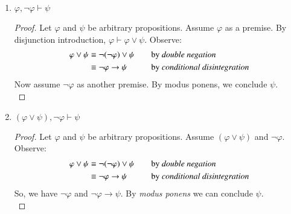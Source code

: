 \documentclass{article}
\newcommand{\lif}{\mathrel{\rightarrow}}
\newcommand{\proves}{\mathrel{\vdash}}
\begin{document}
\begin{enumerate}
\begin{enumerate}
\begin{proof}
\begin{align*}
              \\
            &\equiv \neg(\varphi\lor\psi)\lor\xi
              &\quad
              &\text{by \emph{De Morgan's laws}}
              \\
            &\equiv (\varphi\lor\psi)\lif\xi
              &\quad
              &\text{by \emph{conditional disintegration}}
              \\
        \end{align*}
        So, we have $\varphi\lor\psi$ and$(\varphi\lor\psi)\lif\xi$. By \emph{modus ponens} we can conclude $\xi$.\\
        \end{proof}
\pagebreak
        \item $\varphi, \neg \varphi \proves \psi$
        \begin{proof}
        Let $\varphi$ and $\psi$ be arbitrary propositions. Assume $\varphi$ as a premise. By disjunction introduction, $\varphi\proves\varphi\lor\psi$. Observe:
        \begin{align*}
          \varphi\lor\psi
            &\equiv \neg(\neg\varphi)\lor\psi
              &\quad
              &\text{by \emph{double negation}}
              \\
            &\equiv \neg\varphi\lif\psi
              &\quad
              &\text{by \emph{conditional disintegration}}
              \\
        \end{align*}
        Now assume $\neg\varphi$ as another premise. By modus ponens, we conclude $\psi$.\\
        \end{proof}
        \item $(\varphi \lor \psi), \neg \varphi \proves \psi$
        \begin{proof}
        Let $\varphi$ and $\psi$ be arbitrary propositions. Assume $(\varphi\lor\psi)$ and $\neg\varphi$. Observe:
        \begin{align*}
          \varphi\lor\psi
            &\equiv \neg(\neg\varphi)\lor\psi
              &\quad
              &\text{by \emph{double negation}}
              \\
            &\equiv \neg\varphi\lif\psi
              &\quad
              &\text{by \emph{conditional disintegration}}
              \\
        \end{align*}
        So, we have $\neg\varphi$ and $\neg\varphi\lif\psi$. By \emph{modus ponens} we can conclude $\psi$.\\

\end{proof}
\end{enumerate}
\end{enumerate}
\end{document}
